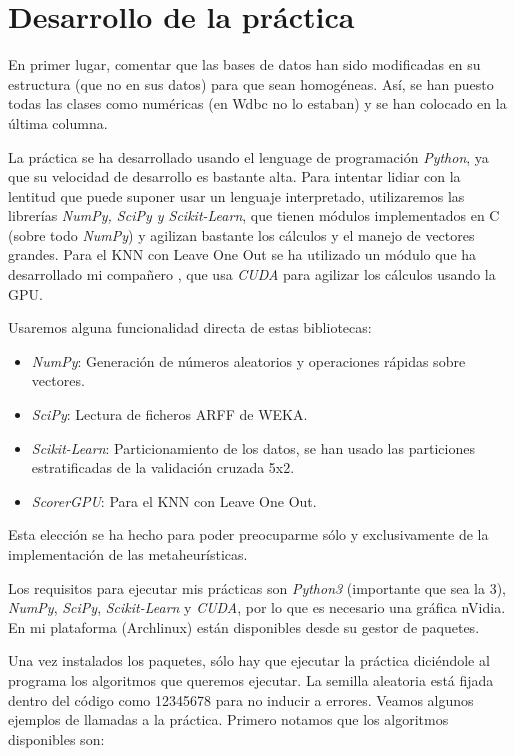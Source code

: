 \documentclass[a4paper, 11pt]{article}
\begin{document}
  \section{Desarrollo de la práctica}
    En primer lugar, comentar que las bases de datos han sido modificadas en su estructura (que no en sus datos) para que sean homogéneas. Así, se han puesto todas las clases como numéricas (en Wdbc no lo estaban) y se han colocado en la última columna.

    La práctica se ha desarrollado usando el lenguage de programación \emph{Python}, ya que su velocidad de desarrollo es bastante alta. Para intentar lidiar con la lentitud que puede suponer usar un lenguaje interpretado, utilizaremos las librerías \emph{NumPy, SciPy y Scikit-Learn}, que tienen módulos implementados en C (sobre todo \emph{NumPy}) y agilizan bastante los cálculos y el manejo de vectores grandes. Para el KNN con Leave One Out se ha utilizado un módulo que ha desarrollado mi compañero , que usa \emph{CUDA} para agilizar los cálculos usando la GPU.

    Usaremos alguna funcionalidad directa de estas bibliotecas:
    \begin{itemize}
      \item \emph{NumPy}: Generación de números aleatorios y operaciones rápidas sobre vectores.
      \item \emph{SciPy}: Lectura de ficheros ARFF de WEKA.
      \item \emph{Scikit-Learn}: Particionamiento de los datos, se han usado las particiones estratificadas de la validación cruzada 5x2.
      \item \emph{ScorerGPU}: Para el KNN con Leave One Out.
    \end{itemize}

    Esta elección se ha hecho para poder preocuparme sólo y exclusivamente de la implementación de las metaheurísticas.

    Los requisitos para ejecutar mis prácticas son \emph{Python3} (importante que sea la 3), \emph{NumPy}, \emph{SciPy}, \emph{Scikit-Learn} y \emph{CUDA}, por lo que es necesario una gráfica nVidia. En mi plataforma (Archlinux) están disponibles desde su gestor de paquetes.

    Una vez instalados los paquetes, sólo hay que ejecutar la práctica diciéndole al programa los algoritmos que queremos ejecutar. La semilla aleatoria está fijada dentro del código como 12345678 para no inducir a errores. Veamos algunos ejemplos de llamadas a la práctica. Primero notamos que los algoritmos disponibles son:
\end{document}
